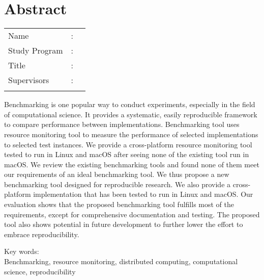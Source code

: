 %
%
%

\chapter*{Abstract}

\vspace*{0.2cm}
{
	\setlength{\parindent}{0pt}

	\begin{tabular}{@{}l l p{10cm}}
		Name&: & \penulis \\
		Study Program&: & \program \\
		Title&: & \judulInggris \\
		Supervisors&: & \pembimbing \\
				   &  & \pembimbingDua \\
	\end{tabular}

	\bigskip
	\bigskip

	Benchmarking is one popular way to conduct experiments, especially in the field of computational science.
	It provides a systematic, easily reproducible framework to compare performance between implementations.
	Benchmarking tool uses resource monitoring tool to measure the performance of selected implementations to selected test instances.
	We provide a cross-platform resource monitoring tool tested to run in Linux and macOS after seeing none of the existing tool run in macOS.
	We review the existing benchmarking tools and found none of them meet our requirements of an ideal benchmarking tool.
	We thus propose a new benchmarking tool designed for reproducible research.
	We also provide a cross-platform implementation that has been tested to run in Linux and macOS.
	Our evaluation shows that the proposed benchmarking tool fulfills most of the requirements, except for comprehensive documentation and testing.
	The proposed tool also shows potential in future development to further lower the effort to embrace reproducibility.

	\bigskip

	Key words:\\
	Benchmarking, resource monitoring, distributed computing, computational science, reproducibility
}

\newpage